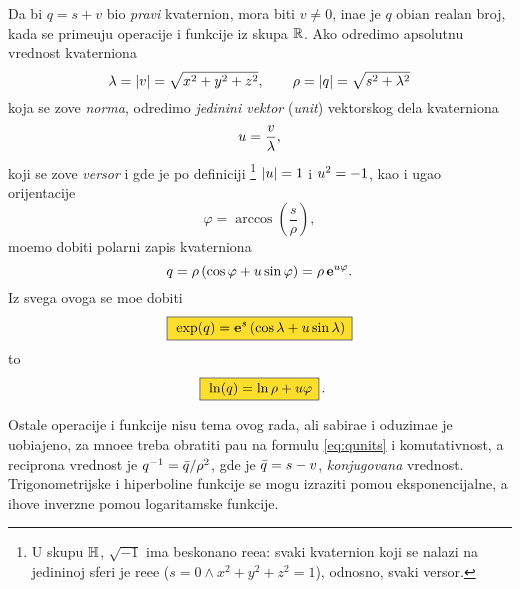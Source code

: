 Da bi $q=s+v$ bio {\sl pravi\/} kvaternion, mora biti $v\ne0$, ina{\cv}e je $q$ obi{\cv}an realan broj, 
kada se prime{\nj}uju operacije i funkcije iz skupa ${\mathbb R}$.
Ako odredimo apsolutnu vrednost kvaterniona
$$
\lambda = {\vert v\vert} = \sqrt{\mathstrut x^2+y^2+z^2},\qquad
\rho = {\vert q\vert} = \sqrt{\mathstrut s^2+\lambda^2}
$$
koja se zove {\sl norma\/}, odredimo
{\sl jedini{\cv}ni vektor\/} ({\sl unit\/}) vektorskog dela kvaterniona
$$
{u} = \frac v\lambda, 
$$
koji se zove {\sl versor}
i gde je po definiciji%
\footnote{U skupu ${\mathbb H}$, $\sqrt{-1}$ ima beskona{\cv}no re{\sv}e{\nj}a:
svaki kvaternion koji se nalazi na jedini{\cv}noj sferi je re{\sv}e{\nj}e
($s=0\land x^2+y^2+z^2=1$), odnosno, svaki versor.} 
${\vert{u}\vert}=1$ i  ${u}^2=-1$,
kao i ugao orijentacije
$$
\varphi = \arccos\left( \frac s\rho \right),
$$
mo{\zv}emo dobiti polarni zapis kvaterniona
\begin{equation}
    q
=\rho\,(\cos\varphi + {u}\sin\varphi)
=\rho\,{\bf e}^{{u}\varphi}.
\end{equation}
Iz svega ovoga se mo{\zv}e dobiti
\begin{equation}
    \okvir{\exp(q) = \e^s \left( \cos\lambda + \uv\sin\lambda \right)}
\end{equation}
\hbox to \textwidth{\hss i\hss}
\begin{equation}
    \okvir{\ln(q)  = \ln\rho + \uv\varphi}\rlap{.}
\end{equation}

\medskip

\danger
Ostale operacije i funkcije nisu tema ovog rada, ali sabira{\nj}e i oduzima{\nj}e
je uobi\-{\cv}a\-jeno, za mno{\zv}e{\nj}e treba obratiti pa{\zv}{\nj}u na formulu \eqref{eq:qunits} i
komutativnost, a recipro{\cv}na vrednost je
$q^{-1}={\bar q}/\rho^2$, gde je ${\bar q}=s-v$, {\sl konjugovana\/} vrednost. 
Tri\-gono\-metrijske i hiperboli{\cv}ne funkcije se mogu izraziti pomo{\cc}u eksponencijalne,
a {\nj}ihove inverzne pomo{\cc}u logaritamske funkcije.\par


